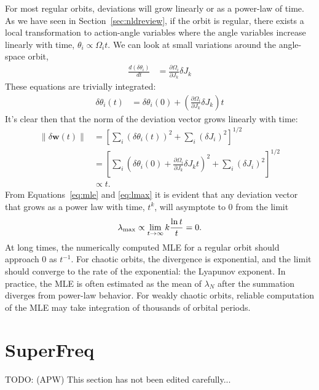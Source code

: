 \documentclass[letterpaper,12pt,preprint]{aastex}
\newcommand{\bs}[1]{\boldsymbol{#1}}
\newcommand{\todo}[2]{{\color{red} TODO: (\MakeUppercase{#1}) #2}}
\begin{document}
For most regular orbits, deviations will grow linearly or as a power-law of time. As we have seen in Section~\ref{sec:nldreview}, if the orbit is regular, there exists a local transformation to action-angle variables where the angle variables increase linearly with time, $\theta_i \propto \Omega_i t$. We can look at small variations around the angle-space orbit,
\begin{align}
	\frac{d (\delta \theta_i)}{dt} &= \frac{\partial \Omega_i}{\partial J_k} \delta J_k
\end{align}
These equations are trivially integrated:
\begin{align}
	\delta \theta_i(t) &= \delta \theta_i(0) + \left(\frac{\partial \Omega_i}{\partial J_k} \delta J_k \right) t
\end{align}
It's clear then that the norm of the deviation vector grows linearly with time:
\begin{align}
	\|\delta \bs{w}(t)\| &= \left[\sum_i (\delta \theta_i(t))^2 + \sum_i (\delta J_i)^2\right]^{1/2}\\
	&= \left[\sum_i \left(\delta \theta_i(0) + \frac{\partial \Omega_i}{\partial J_k} \delta J_k t\right)^2 + \sum_i (\delta J_i)^2\right]^{1/2}\\
	&\propto t.
\end{align}
From Equations~\ref{eq:mle} and \ref{eq:lmax} it is evident that any deviation vector that grows as a power law with time, $t^k$, will asymptote to 0 from the limit 
\begin{equation}
	\lambda_{\rm max} \propto \lim_{t\rightarrow \infty} k \frac{\ln t}{t} = 0.
\end{equation}
At long times, the numerically computed MLE for a regular orbit should approach 0 as $t^{-1}$. For chaotic orbits, the divergence is exponential, and the limit should converge to the rate of the exponential: the Lyapunov exponent. In practice, the MLE is often estimated as the mean of $\lambda_N$ after the summation diverges from power-law behavior. For weakly chaotic orbits, reliable computation of the MLE may take integration of thousands of orbital periods.

\section{SuperFreq}\label{sec:naffapdx}

\todo{apw}{This section has not been edited carefully...}
\end{document}
